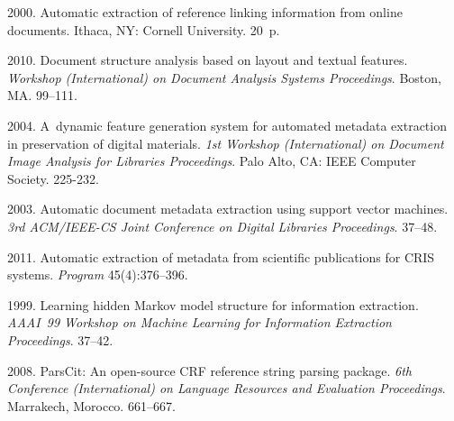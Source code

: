   \begin{multicols}{2}

\renewcommand{\bibname}{\protect\rmfamily References}

{\small\frenchspacing
 {%
 \begin{thebibliography}{99}
         2000. Automatic extraction of reference 
        linking information from online documents.  Ithaca, NY: Cornell University.  20~p.
        
         2010. 
        Document structure analysis based on layout and textual features. 
        \textit{Workshop (International) on Document Analysis Systems Proceedings}. 
        Boston, MA. 99--111.
        
         2004. 
        A~dynamic feature generation system for automated metadata extraction in 
        preservation of digital materials. 
        \textit{1st  Workshop (International) on Document Image Analysis for Libraries
        Proceedings}. Palo Alto, CA: IEEE Computer Society. 225-232.
        
        2003. Automatic document metadata extraction using support vector machines. 
        \textit{3rd ACM/IEEE-CS Joint Conference on Digital Libraries Proceedings}. 
        37--48.
        
        2011. Automatic extraction of metadata from scientific publications 
        for CRIS systems. \textit{Program}  45(4):376--396.
        
         1999. 
        Learning hidden Markov model structure for information extraction. 
        \textit{AAAI~99 Workshop on Machine Learning for Information Extraction
        Proceedings}. 37--42.
        
         2008. ParsCit: An 
        open-source CRF reference string parsing package. 
        \textit{6th  Conference (International) on Language Resources and Evaluation 
        Proceedings}. Marrakech, Morocco. 661--667.
        

\end{thebibliography}}}
\end{multicols}
